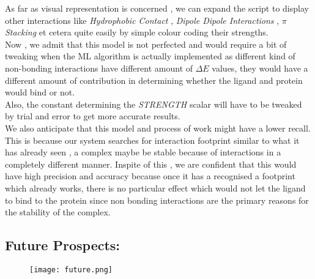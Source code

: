 \documentclass[12pt]{article}%
\begin{document}
			
As far as visual representation is concerned , we can expand the script to display other interactions like \emph{Hydrophobic Contact} , \emph{Dipole Dipole Interactions }, \emph{$\pi$ Stacking} et cetera quite easily by simple colour coding their strengths. \\

Now , we admit that this model is not perfected and would require a bit of tweaking when the ML algorithm is actually implemented as different kind of non-bonding interactions have different amount of $\Delta E$ values, they would have a different amount of contribution in determining whether the ligand and protein would bind or not. \\
Also, the constant determining the \emph{STRENGTH}  scalar will have to be tweaked by trial and error to get more accurate results. \\
We also anticipate that this model and process of work might have a lower recall. This is because our system searches for interaction footprint similar to what it has already seen , a complex maybe be stable because of interactions in a completely different manner. Inspite of this , we are confident that this would have high precision and accuracy because once it has a recognised a footprint which already works, there is no particular effect which would not let the ligand to bind to the protein since non bonding interactions are the primary reasons for the stability of the complex.
 \newpage
\subsection*{Future Prospects:}
\begin{figure}[h]
\centering
\texttt{[image: future.png]}
\end{figure}
\end{document}
